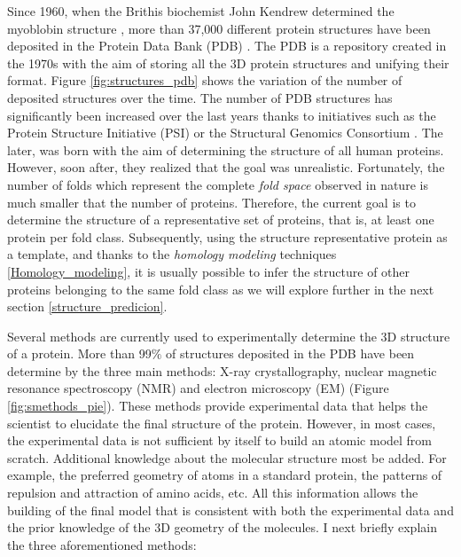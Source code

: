 \documentclass[12pt, b5paper,twoside]{tesi_upf}
\begin{document}
\par Since 1960, when the Brithis biochemist John Kendrew determined the myoblobin structure \cite{KENDREW1960}, more than 37,000 different protein structures have been deposited in the Protein Data Bank (PDB) \cite{Berman2000}. The PDB is a repository created in the 1970s with the aim of storing all the 3D protein structures and unifying their format. Figure \ref{fig:structures_pdb} shows the variation of the number of deposited structures over the time. The number of PDB structures has significantly been increased over the last years thanks to initiatives such as the Protein Structure Initiative (PSI) \cite{Norvell2007} or the Structural Genomics Consortium \cite{GIleadi2007}. The later, was born with the aim of determining the structure of all human proteins. However, soon after, they realized that the goal was unrealistic. Fortunately, the number of folds which represent the complete \textit{fold space} observed in nature is much smaller that the number of proteins. Therefore, the current goal is to determine the structure of a representative set of proteins, that is, at least one protein per fold class. Subsequently, using the structure representative protein as a template, and thanks to the \textit{homology modeling} techniques \ref{Homology_modeling}, it is usually possible to infer the structure of other proteins belonging to the same fold class as we will explore further in the next section \ref{structure_predicion}.
 

\par Several methods are currently used to experimentally determine the 3D structure of a protein. More than 99$\%$ of structures deposited in the PDB have been determine by the three main methods:  X-ray crystallography, nuclear magnetic resonance  spectroscopy (NMR) and electron microscopy (EM) (Figure \ref{fig:smethods_pie}). These methods provide experimental data that helps the scientist to elucidate the final structure of the protein. However, in most cases, the experimental data is not sufficient by itself to build an atomic model from scratch. Additional knowledge about the molecular structure most be added. For example, the preferred geometry of atoms in a standard protein, the patterns of repulsion and attraction of amino acids, etc. All this information allows the building of the final model that is consistent with both the experimental data and the prior knowledge of the 3D geometry of the molecules. I next briefly explain the three aforementioned methods:
\end{document}
